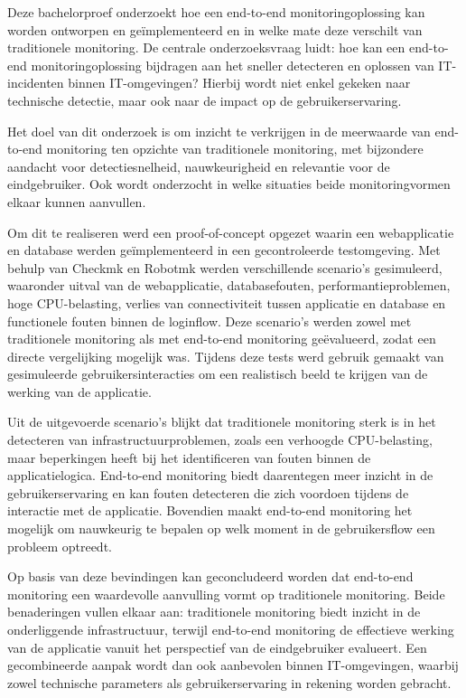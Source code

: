 Deze bachelorproef onderzoekt hoe een end-to-end monitoringoplossing kan worden ontworpen en geïmplementeerd en in welke mate deze verschilt van traditionele monitoring. De centrale onderzoeksvraag luidt: hoe kan een end-to-end monitoringoplossing bijdragen aan het sneller detecteren en oplossen van IT-incidenten binnen IT-omgevingen? Hierbij wordt niet enkel gekeken naar technische detectie, maar ook naar de impact op de gebruikerservaring.

Het doel van dit onderzoek is om inzicht te verkrijgen in de meerwaarde van end-to-end monitoring ten opzichte van traditionele monitoring, met bijzondere aandacht voor detectiesnelheid, nauwkeurigheid en relevantie voor de eindgebruiker. Ook wordt onderzocht in welke situaties beide monitoringvormen elkaar kunnen aanvullen.

Om dit te realiseren werd een proof-of-concept opgezet waarin een webapplicatie en database werden geïmplementeerd in een gecontroleerde testomgeving. Met behulp van Checkmk en Robotmk werden verschillende scenario’s gesimuleerd, waaronder uitval van de webapplicatie, databasefouten, performantieproblemen, hoge CPU-belasting, verlies van connectiviteit tussen applicatie en database en functionele fouten binnen de loginflow. Deze scenario’s werden zowel met traditionele monitoring als met end-to-end monitoring geëvalueerd, zodat een directe vergelijking mogelijk was. Tijdens deze tests werd gebruik gemaakt van gesimuleerde gebruikersinteracties om een realistisch beeld te krijgen van de werking van de applicatie.

Uit de uitgevoerde scenario’s blijkt dat traditionele monitoring sterk is in het detecteren van infrastructuurproblemen, zoals een verhoogde CPU-belasting, maar beperkingen heeft bij het identificeren van fouten binnen de applicatielogica. End-to-end monitoring biedt daarentegen meer inzicht in de gebruikerservaring en kan fouten detecteren die zich voordoen tijdens de interactie met de applicatie. Bovendien maakt end-to-end monitoring het mogelijk om nauwkeurig te bepalen op welk moment in de gebruikersflow een probleem optreedt.

Op basis van deze bevindingen kan geconcludeerd worden dat end-to-end monitoring een waardevolle aanvulling vormt op traditionele monitoring. Beide benaderingen vullen elkaar aan: traditionele monitoring biedt inzicht in de onderliggende infrastructuur, terwijl end-to-end monitoring de effectieve werking van de applicatie vanuit het perspectief van de eindgebruiker evalueert. Een gecombineerde aanpak wordt dan ook aanbevolen binnen IT-omgevingen, waarbij zowel technische parameters als gebruikerservaring in rekening worden gebracht.
